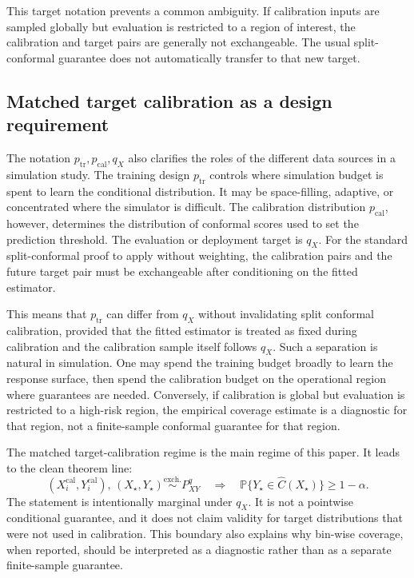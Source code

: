 \documentclass[11pt]{article}
\newcommand{\Pp}{\mathbb P}
\begin{document}
This target notation prevents a common ambiguity. If calibration inputs are sampled globally but evaluation is restricted to a region of interest, the calibration and target pairs are generally not exchangeable. The usual split-conformal guarantee does not automatically transfer to that new target.

\subsection{Matched target calibration as a design requirement}

The notation \(p_{\mathrm{tr}},p_{\mathrm{cal}},q_X\) also clarifies the roles of the different data sources in a simulation study. The training design \(p_{\mathrm{tr}}\) controls where simulation budget is spent to learn the conditional distribution. It may be space-filling, adaptive, or concentrated where the simulator is difficult. The calibration distribution \(p_{\mathrm{cal}}\), however, determines the distribution of conformal scores used to set the prediction threshold. The evaluation or deployment target is \(q_X\). For the standard split-conformal proof to apply without weighting, the calibration pairs and the future target pair must be exchangeable after conditioning on the fitted estimator.

This means that \(p_{\mathrm{tr}}\) can differ from \(q_X\) without invalidating split conformal calibration, provided that the fitted estimator is treated as fixed during calibration and the calibration sample itself follows \(q_X\). Such a separation is natural in simulation. One may spend the training budget broadly to learn the response surface, then spend the calibration budget on the operational region where guarantees are needed. Conversely, if calibration is global but evaluation is restricted to a high-risk region, the empirical coverage estimate is a diagnostic for that region, not a finite-sample conformal guarantee for that region.

The matched target-calibration regime is the main regime of this paper. It leads to the clean theorem line:
\[
  (X_i^{\mathrm{cal}},Y_i^{\mathrm{cal}}),\,(X_\star,Y_\star)
  \stackrel{\mathrm{exch.}}{\sim} P^q_{XY}
  \quad\Longrightarrow\quad
  \Pp\{Y_\star\in\widehat C(X_\star)\}\ge 1-\alpha .
\]
The statement is intentionally marginal under \(q_X\). It is not a pointwise conditional guarantee, and it does not claim validity for target distributions that were not used in calibration. This boundary also explains why bin-wise coverage, when reported, should be interpreted as a diagnostic rather than as a separate finite-sample guarantee.
\end{document}
